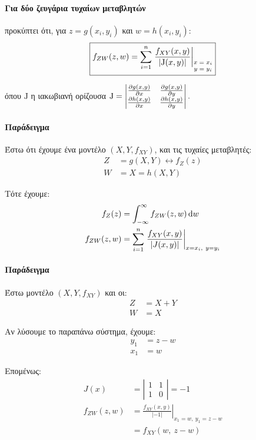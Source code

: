 \documentclass[11pt,a4paper,notitlepage,fleqn,draft]{article}
\begin{document}
	\paragraph{Για δύο ζευγάρια τυχαίων μεταβλητών}
	προκύπτει ότι, για \( z=g(x_i,y_i) \) και \( w=h(x_i,y_i) \):
	\[
	\boxed{
		f_{ZW}(z,w) = \sum_{i=1}^{n} \left.
		\frac{f_{XY}(x,y)}{\left|\mathrm J(x,y)\right|}
		\right|_{\scriptsize \begin{matrix}
			x=x_i \\ y=y_i
			\end{matrix}}
		}
	\]
	
	όπου \( \mathrm J \) η ιακωβιανή ορίζουσα \( 
	\mathrm J = \left|\begin{matrix}
	\pd{g(x,y)}{x} & \pd{g(x,y)}{y} \\
	\pd{h(x,y)}{x} & \pd{h(x,y)}{y}
	\end{matrix}\right|.
	 \)
	 
	\paragraph{Παράδειγμα}
	Έστω ότι έχουμε ένα μοντέλο \( \left(X,Y,f_{XY}\right) \), και τις
	τυχαίες μεταβλητές:
	\begin{align*}
		Z &= g(X,Y) \leftrightarrow f_Z(z) \\
		W &= X = h(X,Y)
	\end{align*}
	
	Τότε έχουμε:
	\begin{align*}
	    f_Z(z) &= \int_{-\infty}^{\infty} f_{ZW}(z,w)\mathop{}\!\mathrm{d} w\\
		f_{ZW}(z,w) &= \sum_{i=1}^{n} \left.
		\frac{f_{XY}(x,y)}{\left|J(x,y)\right|} \right|_{x=x_i,\ y=y_i}
	\end{align*}
	
	\paragraph{Παράδειγμα}
	Έστω μοντέλο \( \left(X,Y,f_{XY}\right) \) και οι:
	\begin{align*}
		Z &= X+Y \\
		W &= X
	\end{align*}
	
	Αν λύσουμε το παραπάνω σύστημα, έχουμε:
	\begin{align*}
		y_1 &= z-w \\
		x_1 &= w
	\end{align*}
	
	Επομένως:
	\begin{align*}
		J(x) &= \left|\begin{matrix}
		1 & 1 \\ 1 & 0
		\end{matrix}\right| = -1\\
		f_{ZW}(z,w) &= \left. \frac{f_{XY}(x,y)}{|-1|}
		\right|_{x_1=w,\ y_1=z-w} \\ &= f_{XY}(w,\ z-w)
	\end{align*}
	
\end{document}
